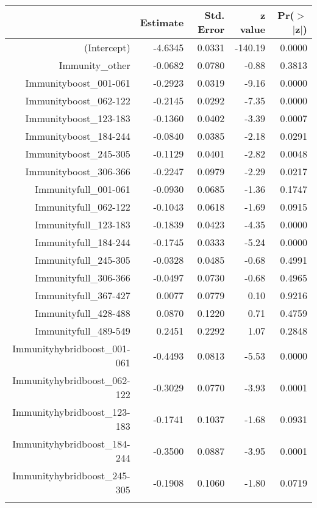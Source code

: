 \begin{table}[ht]
\centering
\begin{tabular}{rrrrr}
  \hline
 & Estimate & Std. Error & z value & Pr($>$$|$z$|$) \\ 
  \hline
(Intercept) & -4.6345 & 0.0331 & -140.19 & 0.0000 \\ 
  Immunity\_other & -0.0682 & 0.0780 & -0.88 & 0.3813 \\ 
  Immunityboost\_001-061 & -0.2923 & 0.0319 & -9.16 & 0.0000 \\ 
  Immunityboost\_062-122 & -0.2145 & 0.0292 & -7.35 & 0.0000 \\ 
  Immunityboost\_123-183 & -0.1360 & 0.0402 & -3.39 & 0.0007 \\ 
  Immunityboost\_184-244 & -0.0840 & 0.0385 & -2.18 & 0.0291 \\ 
  Immunityboost\_245-305 & -0.1129 & 0.0401 & -2.82 & 0.0048 \\ 
  Immunityboost\_306-366 & -0.2247 & 0.0979 & -2.29 & 0.0217 \\ 
  Immunityfull\_001-061 & -0.0930 & 0.0685 & -1.36 & 0.1747 \\ 
  Immunityfull\_062-122 & -0.1043 & 0.0618 & -1.69 & 0.0915 \\ 
  Immunityfull\_123-183 & -0.1839 & 0.0423 & -4.35 & 0.0000 \\ 
  Immunityfull\_184-244 & -0.1745 & 0.0333 & -5.24 & 0.0000 \\ 
  Immunityfull\_245-305 & -0.0328 & 0.0485 & -0.68 & 0.4991 \\ 
  Immunityfull\_306-366 & -0.0497 & 0.0730 & -0.68 & 0.4965 \\ 
  Immunityfull\_367-427 & 0.0077 & 0.0779 & 0.10 & 0.9216 \\ 
  Immunityfull\_428-488 & 0.0870 & 0.1220 & 0.71 & 0.4759 \\ 
  Immunityfull\_489-549 & 0.2451 & 0.2292 & 1.07 & 0.2848 \\ 
  Immunityhybridboost\_001-061 & -0.4493 & 0.0813 & -5.53 & 0.0000 \\ 
  Immunityhybridboost\_062-122 & -0.3029 & 0.0770 & -3.93 & 0.0001 \\ 
  Immunityhybridboost\_123-183 & -0.1741 & 0.1037 & -1.68 & 0.0931 \\ 
  Immunityhybridboost\_184-244 & -0.3500 & 0.0887 & -3.95 & 0.0001 \\ 
  Immunityhybridboost\_245-305 & -0.1908 & 0.1060 & -1.80 & 0.0719 \\ 
$$
\end{tabular}
\end{table}
